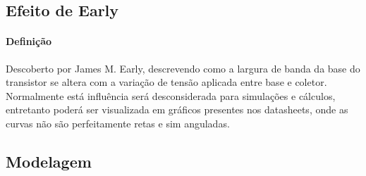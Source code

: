 \documentclass{article}
\begin{document}
        \subsection{Efeito de Early}
            \paragraph{Definição}Descoberto por James M. Early, descrevendo como a largura de banda da base do transistor se altera com a variação de tensão aplicada entre base e coletor. Normalmente está influência será desconsiderada para simulações e cálculos, entretanto poderá ser visualizada em gráficos presentes nos datasheets, onde as curvas não são perfeitamente retas e sim anguladas.

        \subsection{Modelagem}
\end{document}
